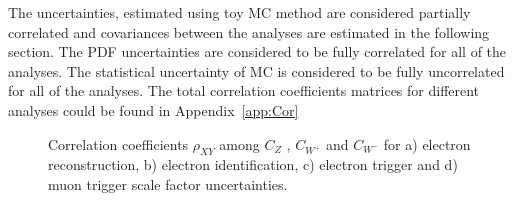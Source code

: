 The uncertainties, estimated using toy MC method are considered partially correlated and covariances between the analyses are estimated in the following section. The PDF uncertainties are considered to be fully correlated for all of the analyses. The statistical uncertainty of MC is considered to be fully uncorrelated for all of the analyses. The total correlation coefficients matrices for different analyses could be found in Appendix~\ref{app:Cor}

\begin{figure}[!tbp]
\begin{minipage}[h]{0.49\linewidth}
\end{minipage}
\hfill
\begin{minipage}[h]{0.49\linewidth}
\end{minipage}
\vfill
\begin{minipage}[h]{0.49\linewidth}
\end{minipage}
\hfill
\begin{minipage}[h]{0.49\linewidth}
\end{minipage}

\caption{Correlation coefficients $\rho_{XY}$ among $C_{Z}$ , $C_{W^{+}}$ and $C_{W^{-}}$   for a) electron reconstruction, b) electron identification, c) electron trigger and d) muon trigger scale factor uncertainties.}
\label{fig:CorToy}
\end{figure}


